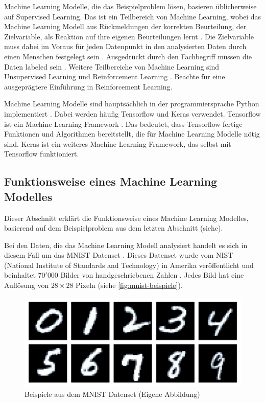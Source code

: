 Machine Learning Modelle, die das Beispielproblem lösen, basieren üblicherweise
auf Supervised Learning. Das ist ein Teilbereich von Machine Learning, wobei das
Machine Learning Modell aus Rückmeldungen der korrekten Beurteilung, der
Zielvariable, als Reaktion auf ihre eigenen Beurteilungen lernt
\cite{laurenz_wuttke_was_2021-1}. Die Zielvariable muss dabei im Voraus für jeden
Datenpunkt in den analysierten Daten durch einen Menschen festgelegt sein
\cite{trahasch_31_2020}. Ausgedrückt durch den Fachbegriff müssen die Daten
labeled sein \cite{luis_g_serrano_21_2021}. Weitere Teilbereiche von Machine
Learning sind Unsupervised Learning und Reinforcement Learning
\cite{arora_supervised_2020}. Beachte  für eine ausgeprägtere
Einführung in Reinforcement Learning.

Machine Learning Modelle sind hauptsächlich in der programmiersprache Python
implementiert \cite{sadie_bennett_why_2019}. Dabei werden häufig Tensorflow und Keras
verwendet. Tensorflow ist ein Machine Learning Framework
\cite{noauthor_tensorflow_nodate}. Das bedeutet, dass Tensorflow fertige
Funktionen und Algorithmen bereitstellt, die für Machine Learning Modelle nötig
sind. Keras ist ein weiteres Machine Learning Framework, das selbst mit
Tensorflow funktioniert.


\subsection{Funktionsweise eines Machine Learning Modelles}\label{sub:t_ml_func}
Dieser Abschnitt erklärt die Funktionsweise eines Machine Learning Modelles,
basierend auf dem Beispielproblem aus dem letzten Abschnitt (siehe). 

Bei den Daten, die das Machine Learning Modell analysiert handelt es sich in
diesem Fall um das MNIST Datenset \cite{yann_lecun_mnist_nodate}. Dieses Datenset
wurde vom NIST (National Institute of Standards and Technology) in Amerika
veröffentlicht und beinhaltet $70'000$ Bilder von handgeschriebenen Zahlen
\cite{noauthor_emnist_2017}. Jedes Bild hat eine Auflösung von $28\times28$
Pixeln (siehe \autoref{fig:mnist-beispiele}).

\begin{figure}[!ht]
    \centering
    \includegraphics[width=\textwidth]{images/theorie/mnist-beispiele.png}
    \caption{Beispiele aus dem MNIST Datenset (Eigene Abbildung)}
    \label{fig:mnist-beispiele}
\end{figure}


